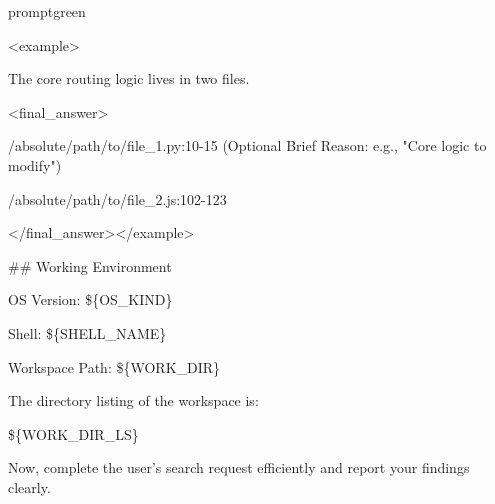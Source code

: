 \begin{promptbox}{promptgreen}
{\vspace{0.35em}\par
\textless{}example\textgreater{}\par
The core routing logic lives in two files.\par
\vspace{0.35em}\par
\textless{}final\_answer\textgreater{}\par
/absolute/path/to/file\_1.py:10-15 (Optional Brief Reason: e.g., "Core logic to modify")\par
/absolute/path/to/file\_2.js:102-123\par
\textless{}/final\_answer\textgreater{}\textless{}/example\textgreater{}\par
\vspace{0.35em}\par
\#\# Working Environment\par
\vspace{0.35em}\par
OS Version: \$\{OS\_KIND\}\par
\vspace{0.35em}\par
Shell: \$\{SHELL\_NAME\}\par
\vspace{0.35em}\par
Workspace Path: \$\{WORK\_DIR\}\par
\vspace{0.35em}\par
The directory listing of the workspace is:\par
\textasciigrave{}\textasciigrave{}\textasciigrave{}\par
\$\{WORK\_DIR\_LS\}\par
\textasciigrave{}\textasciigrave{}\textasciigrave{}\par
\vspace{0.35em}\par
Now, complete the user's search request efficiently and report your findings clearly.\par
}
\end{promptbox}

